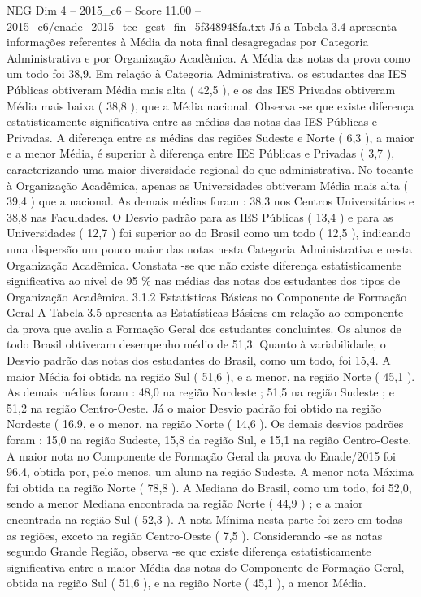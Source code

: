 \begin{textsample}{NEG Dim 4 – 2015\_c6 – Score 11.00 – 2015\_c6/enade\_2015\_tec\_gest\_fin\_5f348948fa.txt}
Já a Tabela 3.4 apresenta informações referentes à Média da nota final desagregadas por Categoria Administrativa e por Organização Acadêmica.
A Média das notas da prova como um todo foi 38,9.
Em relação à Categoria Administrativa, os estudantes das IES Públicas obtiveram Média mais alta ( 42,5 ), e os das IES Privadas obtiveram Média mais baixa ( 38,8 ), que a Média nacional.
Observa -se que existe diferença estatisticamente significativa entre as médias das notas das IES Públicas e Privadas.
A diferença entre as médias das regiões Sudeste e Norte ( 6,3 ), a maior e a menor Média, é superior à diferença entre IES Públicas e Privadas ( 3,7 ), caracterizando uma maior diversidade regional do que administrativa.
No tocante à Organização Acadêmica, apenas as Universidades obtiveram Média mais alta ( 39,4 ) que a nacional.
As demais médias foram : 38,3 nos Centros Universitários e 38,8 nas Faculdades.
O Desvio padrão para as IES Públicas ( 13,4 ) e para as Universidades ( 12,7 ) foi superior ao do Brasil como um todo ( 12,5 ), indicando uma dispersão um pouco maior das notas nesta Categoria Administrativa e nesta Organização Acadêmica.
Constata -se que não existe diferença estatisticamente significativa ao nível de 95 \% nas médias das notas dos estudantes dos tipos de Organização Acadêmica. 3.1.2 Estatísticas Básicas no Componente de Formação Geral A Tabela 3.5 apresenta as Estatísticas Básicas em relação ao componente da prova que avalia a Formação Geral dos estudantes concluintes.
Os alunos de todo Brasil obtiveram desempenho médio de 51,3.
Quanto à variabilidade, o Desvio padrão das notas dos estudantes do Brasil, como um todo, foi 15,4.
A maior Média foi obtida na região Sul ( 51,6 ), e a menor, na região Norte ( 45,1 ).
As demais médias foram : 48,0 na região Nordeste ; 51,5 na região Sudeste ; e 51,2 na região Centro-Oeste.
Já o maior Desvio padrão foi obtido na região Nordeste ( 16,9, e o menor, na região Norte ( 14,6 ).
Os demais desvios padrões foram : 15,0 na região Sudeste, 15,8 da região Sul, e 15,1 na região Centro-Oeste.
A maior nota no Componente de Formação Geral da prova do Enade/2015 foi 96,4, obtida por, pelo menos, um aluno na região Sudeste.
A menor nota Máxima foi obtida na região Norte ( 78,8 ).
A Mediana do Brasil, como um todo, foi 52,0, sendo a menor Mediana encontrada na região Norte ( 44,9 ) ; e a maior encontrada na região Sul ( 52,3 ).
A nota Mínima nesta parte foi zero em todas as regiões, exceto na região Centro-Oeste ( 7,5 ).
Considerando -se as notas segundo Grande Região, observa -se que existe diferença estatisticamente significativa entre a maior Média das notas do Componente de Formação Geral, obtida na região Sul ( 51,6 ), e na região Norte ( 45,1 ), a menor Média.

\end{textsample}
